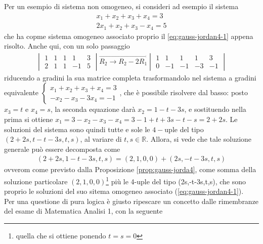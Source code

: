 Per un esempio di sistema non omogeneo, si consideri ad esempio il sistema
\begin{eqnarray*}
  x_1+x_2+x_3+x_4=3\\
  2x_1+x_2+x_3-x_4=5
\end{eqnarray*}
che ha copme sistema omogeneo associato proprio il \ref{eq:gauss-jordan4-1} appena
risolto. Anche qui, con un solo passaggio
\begin{eqnarray*}
  \begin{vmatrix}
    1 & 1 & 1 & 1 & 3\\
    2 & 1 & 1 & -1 & 5
  \end{vmatrix}\overrightarrow{R_2\to R_2-2R_1}
  \begin{vmatrix}
    1 & 1 & 1 & 1 & 3\\
    0 & -1 & -1 & -3 & -1
  \end{vmatrix}
\end{eqnarray*}
riducendo a gradini la sua matrice completa trasformandolo nel sistema a gradini equivalente
$
\begin{cases}
  x_1+x_2+x_3+x_4=3\\
  -x_2-x_3-3x_4=-1
\end{cases}
$, che è possibile risolvere dal basso: posto $x_3=t$ e $x_4=s$, la seconda equazione darà
$x_2=1-t-3s$, e sostituendo nella prima si ottiene $x_1=3-x_2-x_3-x_4=3-1+t+3s-t-s=2+2s$.
Le soluzioni del sistema sono quindi tutte e sole le $4-$uple del tipo $(2+2s, t-t-3s,t,s)$,
al variare di $t,s\in \mathds{R}$. Allora, si vede che tale soluzione generale può essere
decomposta come
\begin{eqnarray*}
  (2+2s,1-t-3s,t,s)=(2,1,0,0)+(2s,-t-3s,t,s)
\end{eqnarray*}
ovverom come previsto dalla Proposizione \ref{prop:gauss-jorda4}, come somma della soluzione
particolare $(2,1,0,0)$\footnote{quella che si ottiene ponendo $t=s=0$} più le 4-uple del tipo
(2s,-t-3s,t,s), che sono proprio le soluzioni del suo sitema omogeneo associato
(\ref{eq:gauss-jordan4-1}).\\
Per una questione di pura logica è giusto ripescare un concetto dalle rimembranze del esame
di Matematica Analisi 1, con la seguente
